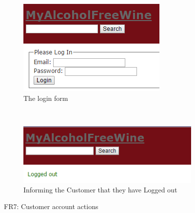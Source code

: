 \documentclass[12pt]{article}
\begin{document}
\begin{figure}[H]
    \centering
    \begin{subfigure}[b]{0.4\textwidth}
        \includegraphics[width=\textwidth]{assets/FR7_screen_1}
        \caption{The login form}
        \label{fig:FR7 Login}
    \end{subfigure}
    ~ %
    \begin{subfigure}[b]{0.4\textwidth}
        \includegraphics[width=\textwidth]{assets/FR7_screen_2}
        \caption{Informing the Customer that they have Logged out}
        \label{fig:FR7 Logout}
    \end{subfigure}
    \caption{FR7: Customer account actions}\label{fig:FR7 Customer Account 1}
\end{figure}
\end{document}
